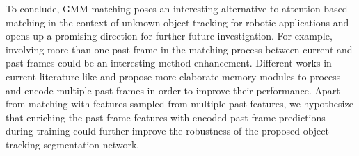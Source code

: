 To conclude, GMM matching poses an interesting alternative to attention-based matching in the context of unknown object tracking for robotic applications and opens up a promising direction for further future investigation. For example, involving more than one past frame in the matching process between current and past frames could be an interesting method enhancement. 
Different works in current literature like \parencite{yang2021aot} and \parencite{cheng2022xmem} propose more elaborate memory modules to process and encode multiple past frames in order to improve their performance. 
Apart from matching with features sampled from multiple past features, we hypothesize that enriching the past frame features with
encoded past frame predictions during training could further improve the robustness of the proposed object-tracking segmentation network. \par
